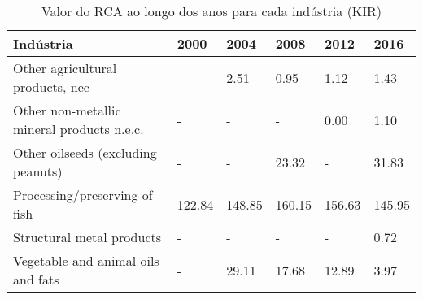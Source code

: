 \begin{table}
\centering
\caption{Valor do RCA ao longo dos anos para cada indústria (KIR)}
\begin{tabular}{p{6cm}p{1.5cm}p{1.5cm}p{1.5cm}p{1.5cm}p{1.5cm}}
\toprule
                                 Indústria &   2000 &   2004 &   2008 &   2012 &   2016 \\
\midrule
          Other agricultural products, nec &      - &   2.51 &   0.95 &   1.12 &   1.43 \\
Other non-metallic mineral products n.e.c. &      - &      - &      - &   0.00 &   1.10 \\
        Other oilseeds (excluding peanuts) &      - &      - &  23.32 &      - &  31.83 \\
             Processing/preserving of fish & 122.84 & 148.85 & 160.15 & 156.63 & 145.95 \\
                 Structural metal products &      - &      - &      - &      - &   0.72 \\
        Vegetable and animal oils and fats &      - &  29.11 &  17.68 &  12.89 &   3.97 \\
\bottomrule
\end{tabular}
\end{table}
